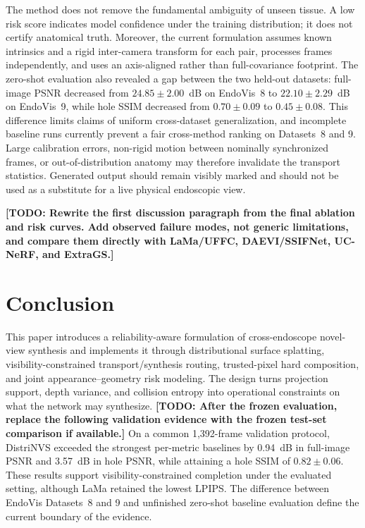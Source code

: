 \documentclass[letterpaper,10pt,conference]{ieeeconf}
\newcommand{\todo}[1]{\textcolor{todoRed}{\textbf{[TODO: #1]}}}
\begin{document}
The method does not remove the fundamental ambiguity of unseen tissue. A low
risk score indicates model confidence under the training distribution; it does
not certify anatomical truth. Moreover, the current formulation assumes known
intrinsics and a rigid inter-camera transform for each pair, processes frames
independently, and uses an axis-aligned rather than full-covariance footprint.
The zero-shot evaluation also revealed a gap between the two held-out datasets:
full-image PSNR decreased from $24.85\pm2.00$~dB on EndoVis~8 to
$22.10\pm2.29$~dB on EndoVis~9, while hole SSIM decreased from
$0.70\pm0.09$ to $0.45\pm0.08$. This difference limits claims of uniform
cross-dataset generalization, and incomplete baseline runs currently prevent a
fair cross-method ranking on Datasets~8 and 9.
Large calibration errors, non-rigid motion between nominally synchronized
frames, or out-of-distribution anatomy may therefore invalidate the transport
statistics. Generated output should remain visibly marked and should not be
used as a substitute for a live physical endoscopic view.

\todo{Rewrite the first discussion paragraph from the final ablation and risk
curves. Add observed failure modes, not generic limitations, and compare them
directly with LaMa/UFFC, DAEVI/SSIFNet, UC-NeRF, and ExtraGS.}

\section{Conclusion}
\label{sec:conclusion}

This paper introduces a reliability-aware formulation of cross-endoscope
novel-view synthesis and implements it through distributional surface
splatting, visibility-constrained transport/synthesis routing, trusted-pixel
hard composition, and joint appearance--geometry risk modeling. The design
turns projection support, depth variance, and collision entropy into operational
constraints on what the network may synthesize. \todo{After the frozen
evaluation, replace the following validation evidence with the frozen test-set
comparison if available.} On a common 1,392-frame validation protocol,
DistriNVS exceeded the strongest per-metric baselines by 0.94~dB in
full-image PSNR and 3.57~dB in hole PSNR, while attaining a hole SSIM of
$0.82\pm0.06$.
These results support visibility-constrained completion under the evaluated
setting, although LaMa retained the lowest LPIPS. The difference between
EndoVis Datasets~8 and 9 and unfinished zero-shot baseline evaluation define
the current boundary of the evidence.



\end{document}
